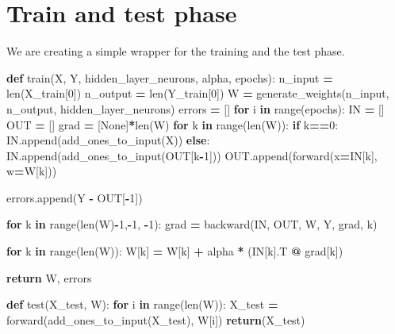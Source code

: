\documentclass[
]{book}
\newenvironment{Shaded}{\begin{snugshade}}{\end{snugshade}}
\newcommand{\BuiltInTok}[1]{#1}
\newcommand{\ControlFlowTok}[1]{\textcolor[rgb]{0.13,0.29,0.53}{\textbf{#1}}}
\newcommand{\DecValTok}[1]{\textcolor[rgb]{0.00,0.00,0.81}{#1}}
\newcommand{\KeywordTok}[1]{\textcolor[rgb]{0.13,0.29,0.53}{\textbf{#1}}}
\newcommand{\NormalTok}[1]{#1}
\newcommand{\OperatorTok}[1]{\textcolor[rgb]{0.81,0.36,0.00}{\textbf{#1}}}
\newcommand{\VariableTok}[1]{\textcolor[rgb]{0.00,0.00,0.00}{#1}}
\begin{document}
\hypertarget{train-and-test-phase}{%
\section{Train and test phase}\label{train-and-test-phase}}

We are creating a simple wrapper for the training and the test phase.

\begin{Shaded}
\begin{Highlighting}[]
\KeywordTok{def}\NormalTok{ train(X, Y, hidden\_layer\_neurons, alpha, epochs):}
\NormalTok{  n\_input }\OperatorTok{=} \BuiltInTok{len}\NormalTok{(X\_train[}\DecValTok{0}\NormalTok{])}
\NormalTok{  n\_output }\OperatorTok{=} \BuiltInTok{len}\NormalTok{(Y\_train[}\DecValTok{0}\NormalTok{])}
\NormalTok{  W }\OperatorTok{=}\NormalTok{ generate\_weights(n\_input, n\_output, hidden\_layer\_neurons)}
\NormalTok{  errors }\OperatorTok{=}\NormalTok{ []}
  \ControlFlowTok{for}\NormalTok{ i }\KeywordTok{in} \BuiltInTok{range}\NormalTok{(epochs):}
\NormalTok{    IN }\OperatorTok{=}\NormalTok{ []}
\NormalTok{    OUT }\OperatorTok{=}\NormalTok{ []}
\NormalTok{    grad }\OperatorTok{=}\NormalTok{ [}\VariableTok{None}\NormalTok{]}\OperatorTok{*}\BuiltInTok{len}\NormalTok{(W)}
    \ControlFlowTok{for}\NormalTok{ k }\KeywordTok{in} \BuiltInTok{range}\NormalTok{(}\BuiltInTok{len}\NormalTok{(W)):}
      \ControlFlowTok{if}\NormalTok{ k}\OperatorTok{==}\DecValTok{0}\NormalTok{:}
\NormalTok{        IN.append(add\_ones\_to\_input(X))}
      \ControlFlowTok{else}\NormalTok{:}
\NormalTok{        IN.append(add\_ones\_to\_input(OUT[k}\OperatorTok{{-}}\DecValTok{1}\NormalTok{]))}
\NormalTok{      OUT.append(forward(x}\OperatorTok{=}\NormalTok{IN[k], w}\OperatorTok{=}\NormalTok{W[k]))}
      
\NormalTok{    errors.append(Y }\OperatorTok{{-}}\NormalTok{ OUT[}\OperatorTok{{-}}\DecValTok{1}\NormalTok{])}
      
    \ControlFlowTok{for}\NormalTok{ k }\KeywordTok{in} \BuiltInTok{range}\NormalTok{(}\BuiltInTok{len}\NormalTok{(W)}\OperatorTok{{-}}\DecValTok{1}\NormalTok{,}\OperatorTok{{-}}\DecValTok{1}\NormalTok{, }\OperatorTok{{-}}\DecValTok{1}\NormalTok{):}
\NormalTok{      grad }\OperatorTok{=}\NormalTok{ backward(IN, OUT, W, Y, grad, k) }
      
    \ControlFlowTok{for}\NormalTok{ k }\KeywordTok{in} \BuiltInTok{range}\NormalTok{(}\BuiltInTok{len}\NormalTok{(W)):}
\NormalTok{      W[k] }\OperatorTok{=}\NormalTok{ W[k] }\OperatorTok{+}\NormalTok{ alpha }\OperatorTok{*}\NormalTok{ (IN[k].T }\OperatorTok{@}\NormalTok{ grad[k])}
      
  \ControlFlowTok{return}\NormalTok{ W, errors}

\KeywordTok{def}\NormalTok{ test(X\_test, W):}
  \ControlFlowTok{for}\NormalTok{ i }\KeywordTok{in} \BuiltInTok{range}\NormalTok{(}\BuiltInTok{len}\NormalTok{(W)):}
\NormalTok{    X\_test }\OperatorTok{=}\NormalTok{ forward(add\_ones\_to\_input(X\_test), W[i])}
  \ControlFlowTok{return}\NormalTok{(X\_test)}
\end{Highlighting}
\end{Shaded}
\end{document}
